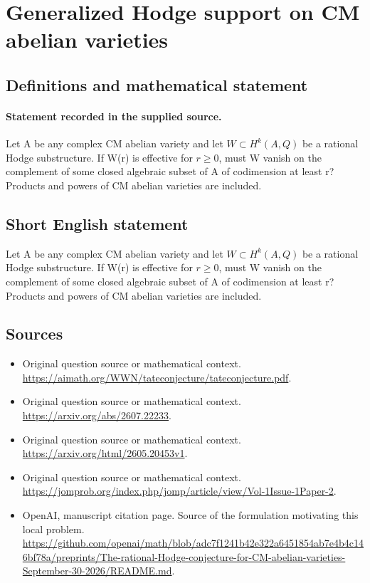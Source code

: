 \documentclass[11pt]{article}
\begin{document}
\section*{Generalized Hodge support on CM abelian varieties}\label{30007027}
\subsection{Definitions and mathematical statement}
\paragraph{Statement recorded in the supplied source.}
Let A be any complex CM abelian variety and let $W\subset H^k(A,Q)$ be a rational Hodge substructure. If W(r) is effective for $r\geq 0$, must W vanish on the complement of some closed algebraic subset of A of codimension at least r? Products and powers of CM abelian varieties are included.
\subsection{Short English statement}
Let A be any complex CM abelian variety and let $W\subset H^k(A,Q)$ be a rational Hodge substructure. If W(r) is effective for $r\geq 0$, must W vanish on the complement of some closed algebraic subset of A of codimension at least r? Products and powers of CM abelian varieties are included.
\subsection{Sources}
\begin{itemize}
\item[S1] Original question source or mathematical context.
\url{https://aimath.org/WWN/tateconjecture/tateconjecture.pdf}.
\item[S2] Original question source or mathematical context.
\url{https://arxiv.org/abs/2607.22233}.
\item[S3] Original question source or mathematical context.
\url{https://arxiv.org/html/2605.20453v1}.
\item[S4] Original question source or mathematical context.
\url{https://jomprob.org/index.php/jomp/article/view/Vol-1Issue-1Paper-2}.
\item[S5] OpenAI, manuscript citation page. Source of the formulation motivating this local problem.
\url{https://github.com/openai/math/blob/adc7f1241b42e322a6451854ab7e4b4c146bf78a/preprints/The-rational-Hodge-conjecture-for-CM-abelian-varieties-September-30-2026/README.md}.
\end{itemize}
\end{document}
